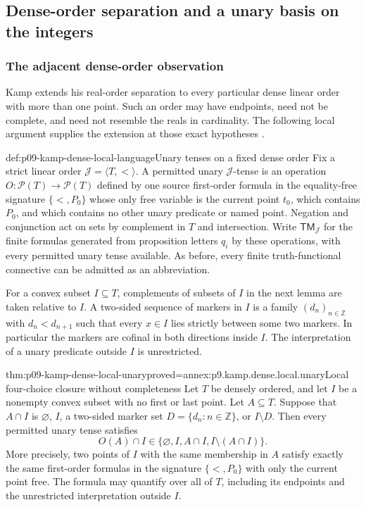 
\subsection{Dense-order separation and a unary basis on the integers}
\label{sec:p09-kamp-iv2-integer-basis}

\subsubsection{The adjacent dense-order observation}

Kamp extends his real-order separation to every particular dense linear
order with more than one point. Such an order may have endpoints, need
not be complete, and need not resemble the reals in cardinality. The
following local argument supplies the extension at those exact hypotheses
\cite[ch.~IV, pp.~99--100]{Kamp1968}.

\begin{hbdefinition}{def:p09-kamp-dense-local-language}{Unary tenses on a fixed dense order}
Fix a strict linear order \(\mathcal J=\langle T,<\rangle\).
A permitted unary \(\mathcal J\)-tense is an operation
\(O:\mathcal P(T)\to\mathcal P(T)\) defined by one source
first-order formula in the equality-free signature \(\{<,P_0\}\)
whose only free variable is the current point
\(t_0\), which contains \(P_0\), and which contains no other
unary predicate or named point. Negation and conjunction act on sets by
complement in \(T\) and intersection. Write
\(\mathsf{TM}_{\mathcal J}\) for the finite formulas generated
from proposition letters \(q_i\) by these operations, with every
permitted unary tense available. As before, every finite
truth-functional connective can be admitted as an abbreviation.

For a convex subset \(I\subseteq T\), complements of subsets of
\(I\) in the next lemma are taken relative to \(I\).
A two-sided sequence of markers in \(I\) is a family
\((d_n)_{n\in\mathbb Z}\) with \(d_n<d_{n+1}\) such that
every \(x\in I\) lies strictly between some two markers.
In particular the markers are cofinal in both directions inside \(I\).
The interpretation of a unary predicate outside \(I\) is unrestricted.
\end{hbdefinition}

\begin{hblemma}{thm:p09-kamp-dense-local-unary}{proved=annex:p9.kamp.dense.local.unary}{Local four-choice closure without completeness}
Let \(T\) be densely ordered, and let \(I\) be a nonempty
convex subset with no first or last point. Let \(A\subseteq T\).
Suppose that \(A\cap I\) is \(\varnothing\), \(I\), a
two-sided marker set \(D=\{d_n:n\in\mathbb Z\}\), or
\(I\setminus D\). Then every permitted unary tense satisfies
\[
 O(A)\cap I\in
       \{\varnothing,I,A\cap I,I\setminus(A\cap I)\}.
\]
More precisely, two points of \(I\) with the same membership in
\(A\) satisfy exactly the same first-order formulas in the signature
\(\{<,P_0\}\) with only the current point free. The formula may
quantify over all of \(T\), including its endpoints and the
unrestricted interpretation outside \(I\).
\end{hblemma}

